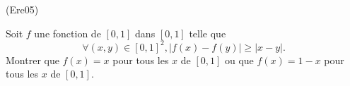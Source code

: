 \begin{tiny}(Ere05)\end{tiny} Soit $f$ une fonction de $\left[ 0,1\right] $ dans $\left[ 0,1\right]$ telle que
\begin{displaymath}
 \forall (x,y)\in \left[ 0,1\right] ^{2},\left| f(x)-f(y)\right|
\geq \left| x-y\right| \text{.}
\end{displaymath}
Montrer que $f(x)=x$ pour tous les $x$ de $[0,1]$ ou que $f(x)=1-x$ pour tous les $x$ de $[0,1]$.